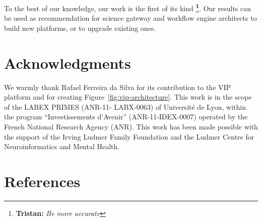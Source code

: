 \documentclass[preprint,3p,twocolumn]{elsarticle}
\newcommand{\note}[2]{\textbf{\Large{\color{blue}\footnote{{\color{blue}\textbf{#1:} \textit{#2}\color{black}}}}}}
\begin{document}
To the best of our knowledge, our work is the first of its kind
\note{Tristan}{Be more accurate}. Our results can be used as
recommendation for science gateway and workflow engine architects to
build new platforms, or to upgrade existing ones.

\section{Acknowledgments}

We warmly thank Rafael Ferreira da Silva for its contribution to the
VIP platform and for creating Figure~\ref{fig:vip-architecture}. This
work is in the scope of the LABEX PRIMES (ANR-11- LABX-0063) of
Universit\'e de Lyon, within the program ``Investissements d’Avenir''
(ANR-11-IDEX-0007) operated by the French National Research Agency
(ANR). This work has been made possible with the support of the Irving
Ludmer Family Foundation and the Ludmer Centre for Neuroinformatics
and Mental Health.

\section*{References}



\end{document}
